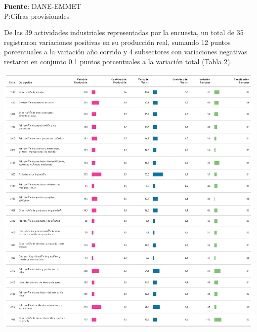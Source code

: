 \documentclass[
]{article}
\begin{document}
\textbf{Fuente}: DANE-EMMET\\
P:Cifras provisionales\\

\newpage

De las 39 actividades industriales representadas por la encuesta, un
total de 35 registraron variaciones positivas en su producción real,
sumando 12 puntos porcentuales a la variación año corrido y 4
subsectores con variaciones negativas restaron en conjunto 0.1 puntos
porcentuales a la variación total (Tabla 2).

\begin{center}\includegraphics[width=14.78in]{tabla2_1} \end{center}
\end{document}
